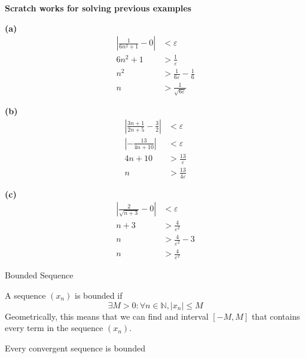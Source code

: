 \begin{note}[Scratch]

    \textbf{Scratch works for solving previous examples} \\
    \begin{minipage}{0.3\textwidth}
        \textbf{(a)}
        \begin{align*}
            \left| \frac{1}{6n^2+1} - 0 \right| &< \varepsilon \\
            6n^2+1 &> \frac{1}{\varepsilon} \\
            n^2 &> \frac{1}{6\varepsilon} - \frac{1}{6} \\
            n &> \frac{1}{\sqrt{6\varepsilon}}
        \end{align*}
    \end{minipage}
    \begin{minipage}{0.33\textwidth}
        \textbf{(b)}
        \begin{align*}
            \left| \frac{3n+1}{2n+5} - \frac{3}{2} \right| &< \varepsilon \\
            \left| -\frac{13}{4n+10} \right| &< \varepsilon \\
            4n+10 &> \frac{13}{\varepsilon} \\
            n &> \frac{13}{4\varepsilon}
        \end{align*}
    \end{minipage}
    \begin{minipage}{0.33\textwidth}
        \textbf{(c)}
        \begin{align*}
            \left| \frac{2}{\sqrt{n+3}} - 0 \right| &< \varepsilon \\
            n + 3 &> \frac{4}{\varepsilon^2} \\
            n &> \frac{4}{\varepsilon^2} - 3 \\
            n &> \frac{4}{\varepsilon^2}
        \end{align*}
    \end{minipage}
\end{note}

\begin{definition}{Bounded Sequence}
    
    A sequence $(x_n)$ is bounded if \[
        \exists M>0 : \forall n\in \mathbb{N}, |x_n|\le M
    \] Geometrically, this means that we can find and interval $[-M,M]$ that contains every term in the sequence $(x_n)$.
\end{definition}

\begin{theorem}{}

    Every convergent sequence is bounded
\end{theorem}


